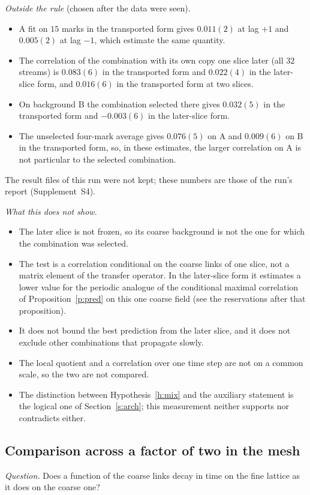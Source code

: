 \emph{Outside the rule} (chosen after the data were seen).
\begin{itemize}
\item A fit on $15$ marks in the transported form gives $0.011(2)$ at lag $+1$ and $0.005(2)$ at lag $-1$,
which estimate the same quantity.
\item The correlation of the combination with its own copy one slice later (all $32$ streams) is $0.083(6)$
in the transported form and $0.022(4)$ in the later-slice form, and $0.016(6)$ in the transported form at two
slices.
\item On background \textsf{B} the combination selected there gives $0.032(5)$ in the transported form and
$-0.003(6)$ in the later-slice form.
\item The unselected four-mark average gives $0.076(5)$ on \textsf{A} and $0.009(6)$ on \textsf{B} in the transported form, so,
in these estimates, the larger correlation on \textsf{A} is not particular to the selected combination.
\end{itemize}
The result files of this run were not kept; these numbers are those of the run's
report (Supplement~S4).

\emph{What this does not show.}
\begin{itemize}
\item The later slice is not frozen, so its coarse background is not the one for which the combination was
selected.
\item The test is a correlation conditional on the coarse links of one slice, not a matrix element of the
transfer operator. In the later-slice form it estimates a lower value for the periodic analogue of the
conditional maximal correlation of Proposition~\ref{p:pred} on this one coarse field (see the reservations
after that proposition).
\item It does not bound the best prediction from the later slice, and it does not exclude other combinations
that propagate slowly.
\item The local quotient and a correlation over one time step are not on a common scale, so the two are not
compared.
\item The distinction between Hypothesis~\ref{h:mix} and the auxiliary statement is the logical one of
Section~\ref{s:arch}; this measurement neither supports nor contradicts either.
\end{itemize}

\subsection{Comparison across a factor of two in the mesh}\label{s:cross}
\emph{Question.} Does a function of the coarse links decay in time on the fine lattice as it does on the
coarse one?

